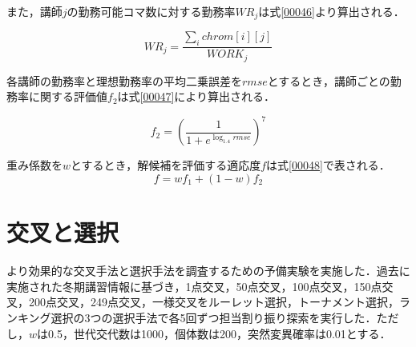 また，講師$j$の勤務可能コマ数に対する勤務率$WR_{j}$は式\ref{00046}より算出される．

\begin{equation}
  \label{00046}
  WR_{j}=\frac{\sum_{i}chrom[i][j]}{WORK_{j}}
\end{equation}

各講師の勤務率と理想勤務率の平均二乗誤差を$rmse$とするとき，講師ごとの勤務率に関する評価値$f_{2}$は式\ref{00047}により算出される．

\begin{equation}
  \label{00047}
  f_{2}=\left(\frac{1}{1+e^{\log_{1.4}rmse}}\right)^{7}
\end{equation}

重み係数を$w$とするとき，解候補を評価する適応度$f$は式\ref{00048}で表される．
\begin{equation}
  \label{00048}
  f=wf_{1}+(1-w)f_{2}
\end{equation}

\section{交叉と選択}
より効果的な交叉手法と選択手法を調査するための予備実験を実施した．過去に実施された冬期講習情報に基づき，1点交叉，50点交叉，100点交叉，150点交叉，200点交叉，249点交叉，一様交叉をルーレット選択，トーナメント選択，ランキング選択の3つの選択手法で各5回ずつ担当割り振り探索を実行した．ただし，$w$は0.5，世代交代数は1000，個体数は200，突然変異確率は0.01とする．


